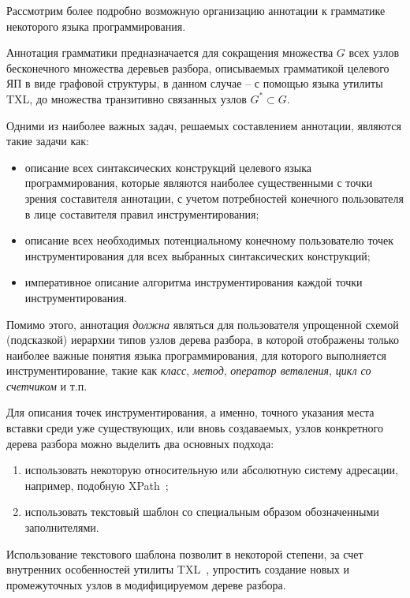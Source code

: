 Рассмотрим более подробно возможную организацию аннотации к грамматике некоторого языка программирования.

Аннотация грамматики предназначается для сокращения множества $G$ всех узлов бесконечного множества деревьев разбора, описываемых грамматикой целевого ЯП в виде графовой структуры, в данном случае -- с помощью языка утилиты TXL, до множества транзитивно связанных узлов $G^* \subset G$.

Одними из наиболее важных задач, решаемых составлением аннотации, являются такие задачи как:

\begin{itemize}[noitemsep]
  \item описание всех синтаксических конструкций целевого языка программирования, которые являются наиболее существенными с точки зрения составителя аннотации, с учетом потребностей конечного пользователя в лице составителя правил инструментирования;
  \item описание всех необходимых потенциальному конечному пользователю точек инструментирования для всех выбранных синтаксических конструкций;
  \item императивное описание алгоритма инструментирования каждой точки инструментирования.
\end{itemize}

Помимо этого, аннотация \textit{должна} являться для пользователя упрощенной схемой (подсказкой) иерархии типов узлов дерева разбора, в которой отображены только наиболее важные понятия языка программирования, для которого выполняется инструментирование, такие как \textit{класс}, \textit{метод}, \textit{оператор ветвления}, \textit{цикл со счетчиком} и т.п.

Для описания точек инструментирования, а именно, точного указания места вставки среди уже существующих, или вновь создаваемых, узлов конкретного дерева разбора можно выделить два основных подхода:

\begin{enumerate}[noitemsep]
  \item использовать некоторую относительную или абсолютную систему адресации, например, подобную XPath~\cite{xpath};
  \item использовать текстовый шаблон со специальным образом обозначенными заполнителями.
\end{enumerate}

Использование текстового шаблона позволит в некоторой степени, за счет внутренних особенностей утилиты TXL~\cite{txl-book}, упростить создание новых и промежуточных узлов в модифицируемом дереве разбора.

